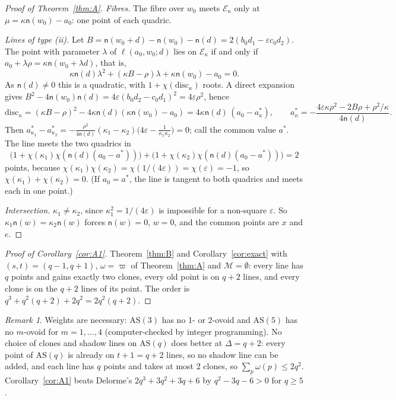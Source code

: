 \documentclass[11pt]{amsart}
\theoremstyle{definition}
\theoremstyle{remark}
\newtheorem{remark}[theorem]{Remark}
\numberwithin{equation}{section}
\newcommand{\AS}{\mathrm{AS}}
\newcommand{\cE}{\mathcal E}
\newcommand{\cM}{\mathcal M}
\newcommand{\eps}{\varepsilon}
\begin{document}
\begin{proof}[Proof of Theorem~\ref{thm:A}]
\emph{Fibres.} The fibre over $w_0$ meets $\cE_\kappa$ only at $\mu=\kappa \mathsf n(w_0)-a_0$: one point of each quadric.

\emph{Lines of type (ii).} Let $B=\mathsf n(w_0+d)-\mathsf n(w_0)-\mathsf n(d)=2(b_0d_1-\eps c_0d_2)$. The point with parameter $\lambda$ of
$\ell(a_0,w_0;d)$ lies on $\cE_\kappa$ if and only if $a_0+\lambda\rho=\kappa \mathsf n(w_0+\lambda d)$, that is,
\begin{equation}\label{eq:quadratic}
\kappa \mathsf n(d)\lambda^2+(\kappa B-\rho)\lambda+\kappa \mathsf n(w_0)-a_0=0.
\end{equation}
As $\mathsf n(d)\ne0$ this is a quadratic, with $1+\chi(\mathrm{disc}_\kappa)$ roots. A direct expansion gives
$B^2-4\mathsf n(w_0)\mathsf n(d)=4\eps(b_0d_2-c_0d_1)^2=4\eps\rho^2$, hence
\[
\mathrm{disc}_\kappa=(\kappa B-\rho)^2-4\kappa \mathsf n(d)(\kappa \mathsf n(w_0)-a_0)=4\kappa \mathsf n(d)\,(a_0-a^*_\kappa),\qquad
a^*_\kappa=-\frac{4\eps\kappa\rho^2-2B\rho+\rho^2/\kappa}{4\mathsf n(d)} .
\]
Then $a^*_{\kappa_1}-a^*_{\kappa_2}=-\frac{\rho^2}{4\mathsf n(d)}(\kappa_1-\kappa_2)\bigl(4\eps-\frac1{\kappa_1\kappa_2}\bigr)=0$; call
the common value $a^*$. The line meets the two quadrics in
\[
\bigl(1+\chi(\kappa_1)\chi(\mathsf n(d)(a_0-a^*))\bigr)+\bigl(1+\chi(\kappa_2)\chi(\mathsf n(d)(a_0-a^*))\bigr)=2
\]
points, because $\chi(\kappa_1)\chi(\kappa_2)=\chi(1/(4\eps))=\chi(\eps)=-1$, so $\chi(\kappa_1)+\chi(\kappa_2)=0$. (If
$a_0=a^*$, the line is tangent to both quadrics and meets each in one point.)

\emph{Intersection.} $\kappa_1\ne\kappa_2$, since $\kappa_1^2=1/(4\eps)$ is impossible for a non-square $\eps$. So
$\kappa_1\mathsf n(w)=\kappa_2\mathsf n(w)$ forces $\mathsf n(w)=0$, $w=0$, and the common points are $x$ and $e$.
\end{proof}

\begin{proof}[Proof of Corollary~\ref{cor:A1}]
Theorem~\ref{thm:B} and Corollary~\ref{cor:exact} with $(s,t)=(q-1,q+1)$, $\omega=\varpi$ of Theorem~\ref{thm:A} and
$\cM=\emptyset$: every line has $q$ points and gains exactly two clones, every old point is on $q+2$ lines, and every
clone is on the $q+2$ lines of its point. The order is $q^3+q^2(q+2)+2q^2=2q^2(q+2)$.
\end{proof}

\begin{remark}
Weights are necessary: $\AS(3)$ has no 1- or 2-ovoid and $\AS(5)$ has no $m$-ovoid for $m=1,\dots,4$ (computer-checked
by integer programming). No choice of clones and shadow lines on $\AS(q)$ does better at $\Delta=q+2$: every point of
$\AS(q)$ is already on $t+1=q+2$ lines, so no shadow line can be added, and each line has $q$ points and takes at most 2
clones, so $\sum_p\omega(p)\le2q^2$. Corollary~\ref{cor:A1} beats Delorme's $2q^3+3q^2+3q+6$ by $q^2-3q-6>0$ for $q\ge5$.
\end{remark}
\end{document}
